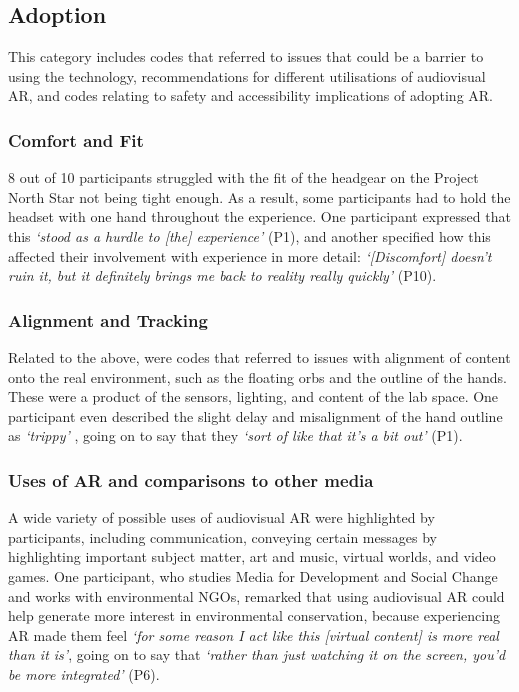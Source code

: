 \subsection{Adoption}\label{sec: polaris-feedback-adoption}
This category includes codes that referred to issues that could be a barrier to using the technology, recommendations for different utilisations of audiovisual AR, and codes relating to safety and accessibility implications of adopting AR.

\subsubsection{Comfort and Fit}\label{sec: polaris-feedback-adoption-comfort}
8 out of 10 participants struggled with the fit of the headgear on the Project North Star not being tight enough. As a result, some participants had to hold the headset with one hand throughout the experience. One participant expressed that this \textit{`stood as a hurdle to [the] experience'} (P1), and another specified how this affected their involvement with experience in more detail: \textit{`[Discomfort] doesn't ruin it, but it definitely brings me back to reality really quickly'} (P10).
\subsubsection{Alignment and Tracking}\label{sec: polaris-feedback-adoption-alignment}
Related to the above, were codes that referred to issues with alignment of content onto the real environment, such as the floating orbs and the outline of the hands. These were a product of the sensors, lighting, and content of the lab space. One participant even described the slight delay and misalignment of the hand outline as \textit{`trippy'} , going on to say that they \textit{`sort of like that it's a bit out'} (P1).

\subsubsection{Uses of AR and comparisons to other media}\label{sec: polaris-feedback-adoption-uses}
A wide variety of possible uses of audiovisual AR were highlighted by participants, including communication, conveying certain messages by highlighting important subject matter, art and music, virtual worlds, and video games.
One participant, who studies Media for Development and Social Change and works with environmental NGOs, remarked that using audiovisual AR could help generate more interest in environmental conservation, because experiencing AR made them feel \textit{`for some reason I act like this [virtual content] is more real than it is'}, going on to say that \textit{`rather than just watching it on the screen, you'd be more integrated'} (P6).

